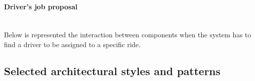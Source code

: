 \documentclass[a4paper,11pt]{report} %
\begin{document}
	\paragraph{Driver's job proposal} \mbox{}\\
	Below is represented the interaction between components when the system has to find a driver to be assigned to a specific ride.\\		
		\begin{minipage}{\linewidth}
		\end{minipage}	
	
	\pagebreak
	\subsection{Selected architectural styles and patterns}
\end{document}
